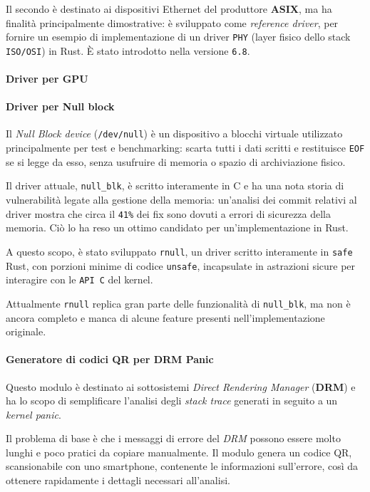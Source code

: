 Il secondo è destinato ai dispositivi Ethernet del produttore \textbf{ASIX}, ma ha finalità principalmente dimostrative:
è sviluppato come \textit{reference driver}, per fornire un esempio di implementazione di un driver \texttt{PHY} (layer fisico dello stack \texttt{ISO/OSI}) in Rust.
È stato introdotto nella versione \texttt{6.8}.

\paragraph{Driver per GPU}

\paragraph{Driver per Null block}
Il \textit{Null Block device} (\texttt{/dev/null}) è un dispositivo a blocchi virtuale utilizzato principalmente per test e benchmarking: scarta tutti i dati scritti e restituisce \texttt{EOF} se si legge da esso, senza usufruire di memoria o spazio di archiviazione fisico.

Il driver attuale, \texttt{null\_blk}, è scritto interamente in C e ha una nota storia di vulnerabilità legate alla gestione della memoria: un'analisi dei 
commit relativi al driver mostra che circa il \texttt{41\%} dei fix sono dovuti a errori di sicurezza della memoria\cite{null-blk}.
Ciò lo ha reso un ottimo candidato per un'implementazione in Rust.

A questo scopo, è stato sviluppato \texttt{rnull}, un driver scritto interamente in \texttt{safe} Rust, con porzioni minime di codice \texttt{unsafe}, incapsulate in astrazioni sicure
 per interagire con le \texttt{API C} del kernel.

 Attualmente \texttt{rnull} replica gran parte delle funzionalità di \texttt{null\_blk}, ma non è ancora completo e manca di alcune feature presenti nell'implementazione originale.

\paragraph{Generatore di codici QR per DRM Panic}
Questo modulo è destinato ai sottosistemi \textit{Direct Rendering Manager} (\textbf{DRM}) e ha lo scopo di semplificare l'analisi degli 
\textit{stack trace} generati in seguito a un \textit{kernel panic}.

Il problema di base è che i messaggi di errore del \textit{DRM} possono essere molto lunghi e poco pratici da copiare manualmente.
Il modulo genera un codice QR, scansionabile con uno smartphone, contenente le informazioni sull'errore, così da ottenere 
rapidamente i dettagli necessari all'analisi.


